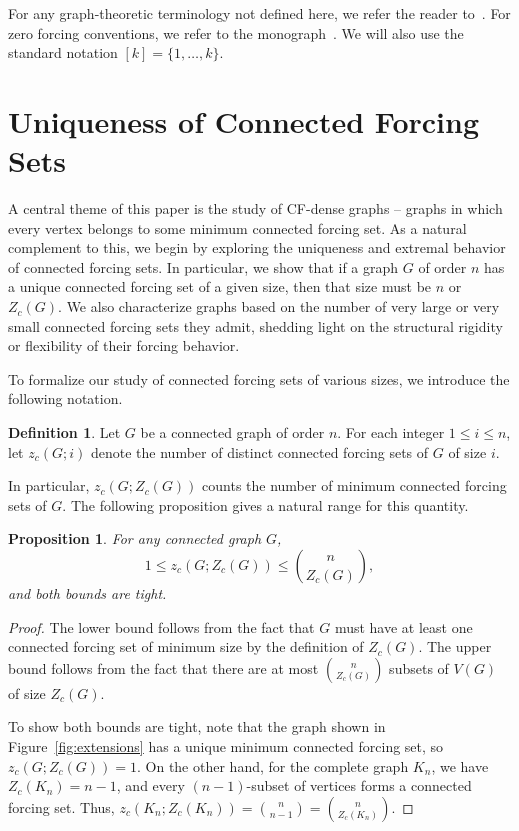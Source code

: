 \documentclass[11pt]{article}
\newtheorem{prop}[thm]{Proposition}
\theoremstyle{definition}
\newtheorem{definition}{Definition}
\newcommand{\1}{\vspace{0.1cm}}
\newcommand{\2}{\vspace{0.2cm}}
\newcommand{\3}{\vspace{0.3cm}}
\begin{document}
For any graph-theoretic terminology not defined here, we refer the reader to~\cite{HaHeHe2024}. For zero forcing conventions, we refer to the monograph~\cite{HoLiSh-zero-forcing-book}. We will also use the standard notation $[k] = \{1, \dots, k\}$. 


\section{Uniqueness of Connected Forcing Sets}
\label{sec:uniqueness}

A central theme of this paper is the study of CF-dense graphs -- graphs in which every vertex belongs to some minimum connected forcing set. As a natural complement to this, we begin by exploring the uniqueness and extremal behavior of connected forcing sets. In particular, we show that if a graph $G$ of order $n$ has a unique connected forcing set of a given size, then that size must be $n$ or $Z_c(G)$. We also characterize graphs based on the number of very large or very small connected forcing sets they admit, shedding light on the structural rigidity or flexibility of their forcing behavior.

To formalize our study of connected forcing sets of various sizes, we introduce the following notation.

\begin{definition}
\label{def_zc}
Let $G$ be a connected graph of order $n$. For each integer $1 \leq i \leq n$, let $z_c(G; i)$ denote the number of distinct connected forcing sets of $G$ of size $i$.
\end{definition}

In particular, $z_c(G; Z_c(G))$ counts the number of minimum connected forcing sets of $G$. The following proposition gives a natural range for this quantity.

\begin{prop}
\label{prop:cf_prop_bound}
For any connected graph $G$, 
\[
1 \leq z_c(G; Z_c(G)) \leq \binom{n}{Z_c(G)},
\]
and both bounds are tight.
\end{prop}
\begin{proof}
The lower bound follows from the fact that $G$ must have at least one connected forcing set of minimum size by the definition of $Z_c(G)$. The upper bound follows from the fact that there are at most $\binom{n}{Z_c(G)}$ subsets of $V(G)$ of size $Z_c(G)$. 

To show both bounds are tight, note that the graph shown in Figure~\ref{fig:extensions} has a unique minimum connected forcing set, so $z_c(G; Z_c(G)) = 1$. On the other hand, for the complete graph $K_n$, we have $Z_c(K_n) = n - 1$, and every $(n-1)$-subset of vertices forms a connected forcing set. Thus, $z_c(K_n; Z_c(K_n)) = \binom{n}{n-1} = \binom{n}{Z_c(K_n)}$.
\end{proof}
\end{document}

